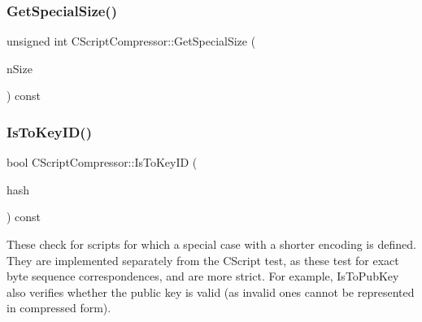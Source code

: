 \mbox{\label{class_c_script_compressor_aa702c1ed206804d016da3600e02d2169}} 
\subsubsection{\texorpdfstring{Get\+Special\+Size()}{GetSpecialSize()}}
{\footnotesize\ttfamily unsigned int C\+Script\+Compressor\+::\+Get\+Special\+Size (\begin{DoxyParamCaption}\item[{unsigned int}]{n\+Size }\end{DoxyParamCaption}) const\hspace{0.3cm}{\ttfamily [protected]}}

\mbox{\label{class_c_script_compressor_a38e2dcfce62bb157b55536d73748f556}} 
\subsubsection{\texorpdfstring{Is\+To\+Key\+I\+D()}{IsToKeyID()}}
{\footnotesize\ttfamily bool C\+Script\+Compressor\+::\+Is\+To\+Key\+ID (\begin{DoxyParamCaption}\item[{\mbox{\hyperlink{class_c_key_i_d}{C\+Key\+ID}} \&}]{hash }\end{DoxyParamCaption}) const\hspace{0.3cm}{\ttfamily [protected]}}

These check for scripts for which a special case with a shorter encoding is defined. They are implemented separately from the C\+Script test, as these test for exact byte sequence correspondences, and are more strict. For example, Is\+To\+Pub\+Key also verifies whether the public key is valid (as invalid ones cannot be represented in compressed form). \mbox{\label{class_c_script_compressor_a19a67455a106e2e0528bc97cb60d2391}} 
